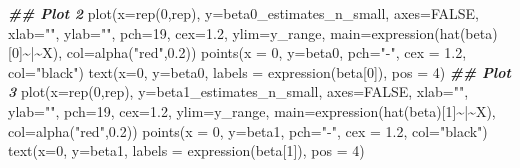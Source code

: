 \documentclass[
  14pt,
]{memoir}
\newenvironment{Shaded}{\begin{snugshade}}{\end{snugshade}}
\newcommand{\AttributeTok}[1]{\textcolor[rgb]{0.77,0.63,0.00}{#1}}
\newcommand{\ConstantTok}[1]{\textcolor[rgb]{0.00,0.00,0.00}{#1}}
\newcommand{\DecValTok}[1]{\textcolor[rgb]{0.00,0.00,0.81}{#1}}
\newcommand{\DocumentationTok}[1]{\textcolor[rgb]{0.56,0.35,0.01}{\textbf{\textit{#1}}}}
\newcommand{\FloatTok}[1]{\textcolor[rgb]{0.00,0.00,0.81}{#1}}
\newcommand{\FunctionTok}[1]{\textcolor[rgb]{0.00,0.00,0.00}{#1}}
\newcommand{\NormalTok}[1]{#1}
\newcommand{\SpecialCharTok}[1]{\textcolor[rgb]{0.00,0.00,0.00}{#1}}
\newcommand{\StringTok}[1]{\textcolor[rgb]{0.31,0.60,0.02}{#1}}
\begin{document}
\begin{Shaded}
\begin{Highlighting}[]
\DocumentationTok{\#\# Plot 2}
\FunctionTok{plot}\NormalTok{(}\AttributeTok{x=}\FunctionTok{rep}\NormalTok{(}\DecValTok{0}\NormalTok{,rep), }\AttributeTok{y=}\NormalTok{beta0\_estimates\_n\_small, }\AttributeTok{axes=}\ConstantTok{FALSE}\NormalTok{, }
     \AttributeTok{xlab=}\StringTok{""}\NormalTok{, }\AttributeTok{ylab=}\StringTok{""}\NormalTok{, }\AttributeTok{pch=}\DecValTok{19}\NormalTok{, }\AttributeTok{cex=}\FloatTok{1.2}\NormalTok{, }\AttributeTok{ylim=}\NormalTok{y\_range,}
  \AttributeTok{main=}\FunctionTok{expression}\NormalTok{(}\FunctionTok{hat}\NormalTok{(beta)[}\DecValTok{0}\NormalTok{]}\SpecialCharTok{\textasciitilde{}}\StringTok{\textquotesingle{}|\textquotesingle{}}\SpecialCharTok{\textasciitilde{}}\NormalTok{X), }\AttributeTok{col=}\FunctionTok{alpha}\NormalTok{(}\StringTok{"red"}\NormalTok{,}\FloatTok{0.2}\NormalTok{))}
\FunctionTok{points}\NormalTok{(}\AttributeTok{x =} \DecValTok{0}\NormalTok{, }\AttributeTok{y=}\NormalTok{beta0, }\AttributeTok{pch=}\StringTok{"{-}"}\NormalTok{, }\AttributeTok{cex =} \FloatTok{1.2}\NormalTok{, }\AttributeTok{col=}\StringTok{"black"}\NormalTok{)}
\FunctionTok{text}\NormalTok{(}\AttributeTok{x=}\DecValTok{0}\NormalTok{, }\AttributeTok{y=}\NormalTok{beta0, }\AttributeTok{labels =} \FunctionTok{expression}\NormalTok{(beta[}\DecValTok{0}\NormalTok{]), }\AttributeTok{pos =} \DecValTok{4}\NormalTok{)}
\DocumentationTok{\#\# Plot 3}
\FunctionTok{plot}\NormalTok{(}\AttributeTok{x=}\FunctionTok{rep}\NormalTok{(}\DecValTok{0}\NormalTok{,rep), }\AttributeTok{y=}\NormalTok{beta1\_estimates\_n\_small, }\AttributeTok{axes=}\ConstantTok{FALSE}\NormalTok{, }
     \AttributeTok{xlab=}\StringTok{""}\NormalTok{, }\AttributeTok{ylab=}\StringTok{""}\NormalTok{, }\AttributeTok{pch=}\DecValTok{19}\NormalTok{, }\AttributeTok{cex=}\FloatTok{1.2}\NormalTok{, }\AttributeTok{ylim=}\NormalTok{y\_range,}
  \AttributeTok{main=}\FunctionTok{expression}\NormalTok{(}\FunctionTok{hat}\NormalTok{(beta)[}\DecValTok{1}\NormalTok{]}\SpecialCharTok{\textasciitilde{}}\StringTok{\textquotesingle{}|\textquotesingle{}}\SpecialCharTok{\textasciitilde{}}\NormalTok{X), }\AttributeTok{col=}\FunctionTok{alpha}\NormalTok{(}\StringTok{"red"}\NormalTok{,}\FloatTok{0.2}\NormalTok{))}
\FunctionTok{points}\NormalTok{(}\AttributeTok{x =} \DecValTok{0}\NormalTok{, }\AttributeTok{y=}\NormalTok{beta1, }\AttributeTok{pch=}\StringTok{"{-}"}\NormalTok{, }\AttributeTok{cex =} \FloatTok{1.2}\NormalTok{, }\AttributeTok{col=}\StringTok{"black"}\NormalTok{)}
\FunctionTok{text}\NormalTok{(}\AttributeTok{x=}\DecValTok{0}\NormalTok{, }\AttributeTok{y=}\NormalTok{beta1, }\AttributeTok{labels =} \FunctionTok{expression}\NormalTok{(beta[}\DecValTok{1}\NormalTok{]), }\AttributeTok{pos =} \DecValTok{4}\NormalTok{)}

\end{Highlighting}
\end{Shaded}
\end{document}
